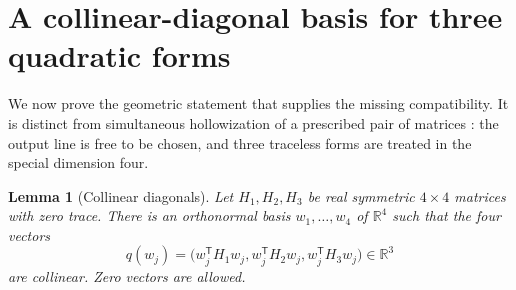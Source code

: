 \documentclass[11pt]{article}
\newtheorem{lemma}[theorem]{Lemma}
\theoremstyle{remark}
\newcommand{\R}{\mathbb{R}}
\begin{document}
\section{A collinear-diagonal basis for three quadratic forms}
\label{sec:lemma}

We now prove the geometric statement that supplies the missing compatibility.
It is distinct from simultaneous hollowization of a prescribed pair of
matrices \cite{damm2020}: the output line is free to be chosen, and three
traceless forms are treated in the special dimension four.

\begin{lemma}[Collinear diagonals]
\label{lem:collinear}
Let $H_1,H_2,H_3$ be real symmetric $4\times4$ matrices with zero trace.
There is an orthonormal basis $w_1,\ldots,w_4$ of $\R^4$ such that the four
vectors
\begin{equation}
 q(w_j)=\bigl(w_j^{\mathsf T}H_1w_j,
                    w_j^{\mathsf T}H_2w_j,
                    w_j^{\mathsf T}H_3w_j\bigr)\in\R^3
 \label{eq:q-vector}
\end{equation}
are collinear.  Zero vectors are allowed.
\end{lemma}
\end{document}
